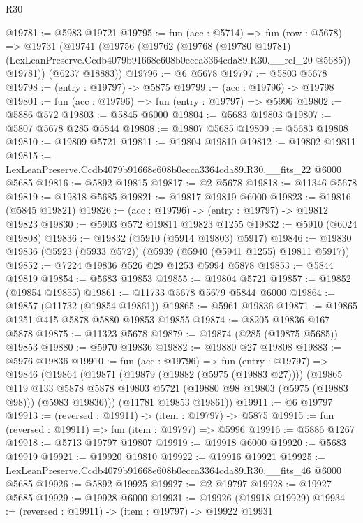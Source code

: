 \begin{lexlean}{R30}
\begin{coremodule}
@19781 := @5983 @19721
@19795 := fun (acc : @5714) =>
  fun (row : @5678) =>
  @19731
    (@19741
      (@19756
        (@19762
          (@19768
            (@19780 @19781)
            (LexLeanPreserve.Ccdb4079b91668e608b0ecca3364cda89.R30.__rel_20 @5685))
          @19781))
      (@6237 @18883))
@19796 := @6 @5678
@19797 := @5803 @5678
@19798 := (entry : @19797) -> @5875
@19799 := (acc : @19796) -> @19798
@19801 := fun (acc : @19796) => fun (entry : @19797) => @5996
@19802 := @5886 @572
@19803 := @5845 @6000
@19804 := @5683 @19803
@19807 := @5807 @5678 @285 @5844
@19808 := @19807 @5685
@19809 := @5683 @19808
@19810 := @19809 @5721
@19811 := @19804 @19810
@19812 := @19802 @19811
@19815 := LexLeanPreserve.Ccdb4079b91668e608b0ecca3364cda89.R30.__fits_22 @6000 @5685
@19816 := @5892 @19815
@19817 := @2 @5678
@19818 := @11346 @5678
@19819 := @19818 @5685
@19821 := @19817 @19819 @6000
@19823 := @19816 (@5845 @19821)
@19826 := (acc : @19796) -> (entry : @19797) -> @19812 @19823
@19830 := @5903 @572 @19811 @19823 @1255
@19832 := @5910 (@6024 @19808)
@19836 := @19832 (@5910 (@5914 @19803) @5917)
@19846 := @19830 @19836 (@5923 (@5933 @572)) (@5939 (@5940 (@5941 @1255) @19811 @5917))
@19852 := @7224 @19836 @526 @29 @1253 @5994 @5878
@19853 := @5844 @19819
@19854 := @5683 @19853
@19855 := @19804 @5721
@19857 := @19852 (@19854 @19855)
@19861 := @11733 @5678 @5679 @5844 @6000
@19864 := @19857 (@11732 (@19854 @19861))
@19865 := @5961 @19836
@19871 := @19865 @1251 @415 @5878 @5880 @19853 @19855
@19874 := @8205 @19836 @167 @5878
@19875 := @11323 @5678
@19879 := @19874 (@285 (@19875 @5685)) @19853
@19880 := @5970 @19836
@19882 := @19880 @27 @19808
@19883 := @5976 @19836
@19910 := fun (acc : @19796) =>
  fun (entry : @19797) =>
  @19846
    (@19864
      (@19871
        (@19879 (@19882 (@5975 (@19883 @27))))
        (@19865
          @119
          @133
          @5878
          @5878
          @19803
          @5721
          (@19880 @98 @19803 (@5975 (@19883 @98)))
          (@5983 @19836)))
      (@11781 @19853 @19861))
@19911 := @6 @19797
@19913 := (reversed : @19911) -> (item : @19797) -> @5875
@19915 := fun (reversed : @19911) => fun (item : @19797) => @5996
@19916 := @5886 @1267
@19918 := @5713 @19797 @19807
@19919 := @19918 @6000
@19920 := @5683 @19919
@19921 := @19920 @19810
@19922 := @19916 @19921
@19925 := LexLeanPreserve.Ccdb4079b91668e608b0ecca3364cda89.R30.__fits_46 @6000 @5685
@19926 := @5892 @19925
@19927 := @2 @19797
@19928 := @19927 @5685
@19929 := @19928 @6000
@19931 := @19926 (@19918 @19929)
@19934 := (reversed : @19911) -> (item : @19797) -> @19922 @19931

\end{coremodule}
\end{lexlean}
